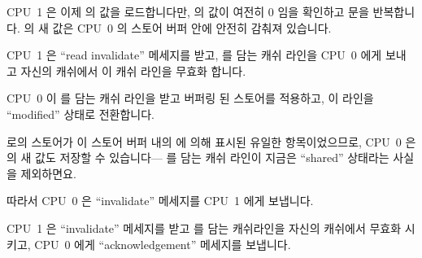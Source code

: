 \begin{sequence}
\fi

\item	CPU~1 은 이제  의 값을 로드합니다만,  의 값이 여전히 0
	임을 확인하고  문을 반복합니다.
	 의 새 값은 CPU~0 의 스토어 버퍼 안에 안전히 감춰져 있습니다.
\item	CPU~1 은 ``read invalidate'' 메세지를 받고,  를 담는 캐쉬 라인을
	CPU~0 에게 보내고 자신의 캐쉬에서 이 캐쉬 라인을 무효화 합니다.
\item	CPU~0 이  를 담는 캐쉬 라인을 받고 버퍼링 된 스토어를 적용하고,
	이 라인을 ``modified'' 상태로 전환합니다.
\item	{} 로의 스토어가 이 스토어 버퍼 내의  에 의해 표시된
	유일한 항목이었으므로, CPU~0 은  의 새 값도 저장할 수
	있습니다--- 를 담는 캐쉬 라인이 지금은 ``shared'' 상태라는
	사실을 제외하면요.
\item	따라서 CPU~0 은 ``invalidate'' 메세지를 CPU~1 에게 보냅니다.
\item	CPU~1 은 ``invalidate'' 메세지를 받고  를 담는 캐쉬라인을 자신의
	캐쉬에서 무효화 시키고, CPU~0 에게 ``acknowledgement'' 메세지를
	보냅니다.

\iffalse

\item	CPU~1 can now load the value of \qco{b},
	but since it finds that the value of \qco{b} is still 0, it repeats
	the \co{while} statement.
	The new value of \qco{b} is safely hidden in CPU~0's store buffer.
\item	CPU~1 receives the ``read invalidate'' message, and
	transmits the cache line containing \qco{a} to CPU~0 and
	invalidates this cache line from its own cache.
\item	CPU~0 receives the cache line containing \qco{a} and applies
	the buffered store, placing this line into the ``modified''
	state.
\item	Since the store to \qco{a} was the only
	entry in the store buffer that was marked by the \co{smp_mb()},
	CPU~0 can also store the new value of \qco{b}---except for the
	fact that the cache line containing \qco{b} is now in ``shared''
	state.
\item	CPU~0 therefore sends an ``invalidate'' message to CPU~1.
\item	CPU~1 receives the ``invalidate'' message, invalidates the
	cache line containing \qco{b} from its cache, and sends an
	``acknowledgement'' message to CPU~0.

\fi


\end{sequence}
